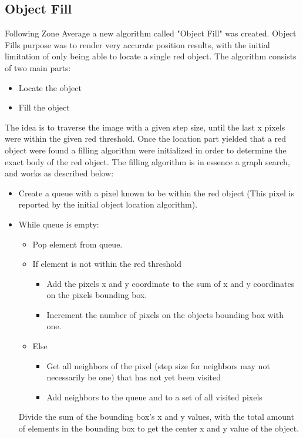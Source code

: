 \subsection{Object Fill}\label{sec:objectfilldesign}
Following Zone Average a new algorithm called "Object Fill" was created.
Object Fills purpose was to render very accurate position results, with the initial limitation of only being able to locate a single red object.
The algorithm consists of two main parts:
\begin{itemize}
	\item Locate the object
	\item Fill the object
\end{itemize}
The idea is to traverse the image with a given step size, until the last x pixels were within the given red threshold.
Once the location part yielded that a red object were found a filling algorithm were initialized in order to determine the exact body of the red object.
The filling algorithm is in essence a graph search, and works as described below:
\begin{itemize}
	\item Create a queue with a pixel known to be within the red object (This pixel is reported by the initial object location algorithm).
	\item While queue is empty:
	\begin{itemize}
		\item Pop element from queue.
		\item If element is not within the red threshold
		\begin{itemize}
			\item Add the pixels x and y coordinate to the sum of x and y coordinates on the pixels bounding box.
			\item Increment the number of pixels on the objects bounding box with one.
		\end{itemize}
		\item Else
		\begin{itemize}
			\item Get all neighbors of the pixel (step size for neighbors may not necessarily be one) that has not yet been visited
			\item Add neighbors to the queue and to a set of all visited pixels
		\end{itemize}
	\end{itemize}
	Divide the sum of the bounding box's x and y values, with the total amount of elements in the bounding box to get the center x and y value of the object.
\end{itemize}

